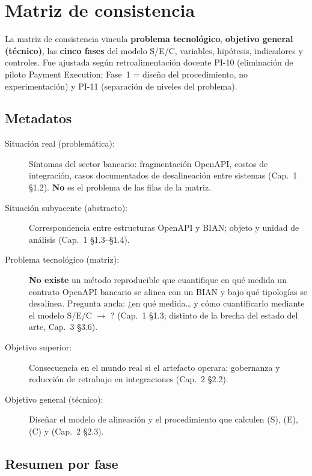 \chapter{Matriz de consistencia}
\label{anexo:c}

La matriz de consistencia vincula \textbf{problema tecnológico}, \textbf{objetivo general
(técnico)}, las \textbf{cinco fases} del modelo S/E/C, variables, hipótesis, indicadores y
controles. Fue ajustada según retroalimentación docente PI-10 (eliminación de piloto Payment
Execution; Fase~1 = diseño del procedimiento, no experimentación) y PI-11 (separación de niveles
del problema).

\section{Metadatos}

\begin{description}
  \item[Situación real (problemática):] Síntomas del sector bancario: fragmentación OpenAPI,
        costos de integración, casos documentados de desalineación entre sistemas (Cap.~1 §1.2).
        \textbf{No} es el problema de las filas de la matriz.
  \item[Situación subyacente (abstracto):] Correspondencia entre estructuras OpenAPI y
        \ServiceDomain{} BIAN; objeto y unidad de análisis (Cap.~1 §1.3--§1.4).
  \item[Problema tecnológico (matriz):] \textbf{No existe} un método reproducible que cuantifique
        en qué medida un contrato OpenAPI bancario se alinea con un \ServiceDomain{} BIAN y bajo
        qué tipologías se desalinea. Pregunta ancla: ¿en qué medida… y cómo cuantificarlo mediante
        el modelo S/E/C $\rightarrow$ \AlignmentScore{}? (Cap.~1 §1.3; distinto de la brecha del
        estado del arte, Cap.~3 §3.6).
  \item[Objetivo superior:] Consecuencia en el mundo real si el artefacto operara: gobernanza y
        reducción de retrabajo en integraciones (Cap.~2 §2.2).
  \item[Objetivo general (técnico):] Diseñar el modelo de alineación y el procedimiento que
        calculen \SemanticScore{} (S), \StructuralScore{} (E), \CoverageScore{} (C) y
        \AlignmentScore{} (Cap.~2 §2.3).
\end{description}

\section{Resumen por fase}

